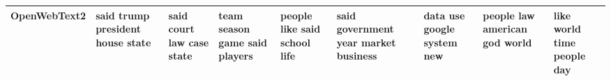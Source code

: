 \documentclass[11pt,a4paper]{article}
\begin{document}
\begin{appendices}
\begin{table}[htp]
\begin{tiny}
\begin{tabular}{|p{}|p{}|p{}|p{}|p{}|p{}|p{}|p{}|p{}|}
OpenWebText2 & said \newline trump \newline president \newline house \newline state & said \newline court \newline law \newline case \newline state & team \newline season \newline game \newline said \newline players & people \newline like \newline said \newline school \newline life & said \newline government \newline year \newline market \newline business & data \newline use \newline google \newline system \newline new & people \newline law \newline american \newline god \newline world & like \newline world \newline time \newline people \newline day\\\hline

\end{tabular}
\end{tiny}
\end{table}
\end{appendices}
\end{document}

